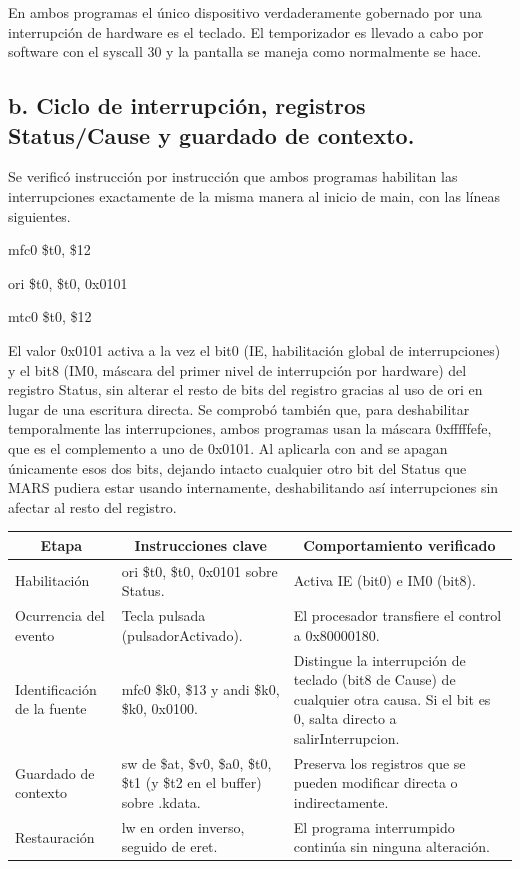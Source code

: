 \documentclass[12pt, letterpaper]{article}
\begin{document}
En ambos programas el único dispositivo verdaderamente gobernado por una interrupción de hardware es el teclado. El temporizador es llevado a cabo por software con el syscall 30 y la pantalla se maneja como normalmente se hace.

\subsection*{b. Ciclo de interrupción, registros Status/Cause y guardado de contexto.}

Se verificó instrucción por instrucción que ambos programas habilitan las interrupciones exactamente de la misma manera al inicio de main, con las líneas siguientes.

mfc0 \$t0, \$12

ori  \$t0, \$t0, 0x0101

mtc0 \$t0, \$12

El valor 0x0101 activa a la vez el bit0 (IE, habilitación global de interrupciones) y el bit8 (IM0, máscara del primer nivel de interrupción por hardware) del registro Status, sin alterar el resto de bits del registro gracias al uso de ori en lugar de una escritura directa. Se comprobó también que, para deshabilitar temporalmente las interrupciones, ambos programas usan la máscara 0xfffffefe, que es el complemento a uno de 0x0101. Al aplicarla con and se apagan únicamente esos dos bits, dejando intacto cualquier otro bit del Status que MARS pudiera estar usando internamente, deshabilitando así interrupciones sin afectar al resto del registro.

\begin{table}[h]
    \centering
    \begin{tabularx}{\linewidth}{| p{4.2cm} | p{3.2cm} | X |}
        \hline
        \multicolumn{1}{|c|}{\textbf{Etapa}} & 
        \multicolumn{1}{c|}{\textbf{Instrucciones clave}} & 
        \multicolumn{1}{c|}{\textbf{Comportamiento verificado}} \\
        \hline
        Habilitación& ori \$t0, \$t0, 0x0101 sobre Status.& Activa IE (bit0) e IM0 (bit8).\\
        \hline
        Ocurrencia del evento& Tecla pulsada (pulsadorActivado).& El procesador transfiere el control a 0x80000180.\\
        \hline
        Identificación de la fuente& mfc0 \$k0, \$13 y andi \$k0, \$k0, 0x0100.& Distingue la interrupción de teclado (bit8 de Cause) de cualquier otra causa. Si el bit es 0, salta directo a salirInterrupcion.\\
        \hline
 Guardado de contexto& sw de \$at, \$v0, \$a0, \$t0, \$t1 (y \$t2 en el buffer) sobre .kdata.&Preserva los registros que se pueden modificar directa o indirectamente.\\\hline
 Restauración& lw en orden inverso, seguido de eret.&El programa interrumpido continúa sin ninguna alteración.\\\hline
    \end{tabularx}
\end{table}
\end{document}
